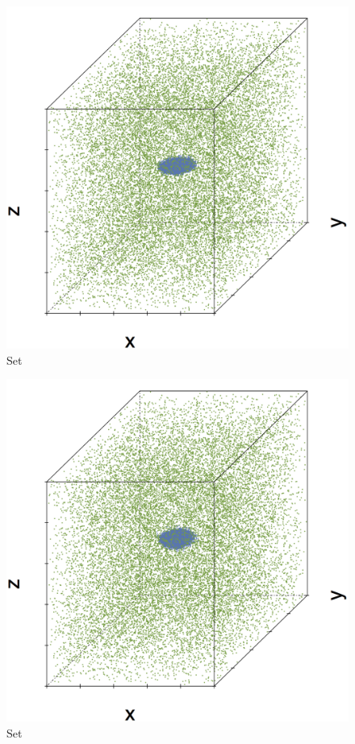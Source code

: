 \begin{subfigure}{0.18\textwidth}
	\centering
	\includegraphics[width=\textwidth]{3/img/datasetplot_baakman_5_60000.png}
	\caption{Set \baakmanFive}
	\label{fig:3:simulated:datasets:baakman5}
\end{subfigure}		
\begin{subfigure}{0.18\textwidth}
	\centering
	\includegraphics[width=\textwidth]{3/img/datasetplot_baakman_1_60000.png}
	\caption{Set \baakmanOne}
	\label{fig:3:simulated:datasets:baakman1}
\end{subfigure}
